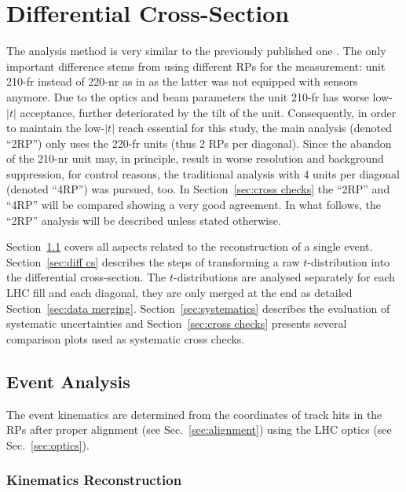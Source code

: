 \section{Differential Cross-Section}
\label{sec:differential cross-section}

The analysis method is very similar to the previously published one \cite{totem-8tev-1km}. The only important difference stems from using different RPs for the measurement: unit 210-fr instead of 220-nr as in \cite{totem-8tev-1km} as the latter was not equipped with sensors anymore. Due to the optics and beam parameters the unit 210-fr has worse low-$|t|$ acceptance, further deteriorated by the tilt of the unit. Consequently, in order to maintain the low-$|t|$ reach essential for this study, the main analysis (denoted ``2RP'') only uses the 220-fr units (thus 2 RPs per diagonal). Since the abandon of the 210-nr unit may, in principle, result in worse resolution and background suppression, for control reasons, the traditional analysis with 4 units per diagonal (denoted ``4RP'') was pursued, too. In Section~\ref{sec:cross checks} the ``2RP'' and ``4RP'' will be compared showing a very good agreement. In what follows, the ``2RP'' analysis will be described unless stated otherwise.

Section~\ref{sec:event analysis} covers all aspects related to the reconstruction of a single event. Section~\ref{sec:diff cs} describes the steps of transforming a raw $t$-distribution into the differential cross-section. The $t$-distributions are analysed separately for each LHC fill and each diagonal, they are only merged at the end as detailed Section~\ref{sec:data merging}. Section~\ref{sec:systematics} describes the evaluation of systematic uncertainties and Section~\ref{sec:cross checks} presents several comparison plots used as systematic cross checks.

\subsection{Event Analysis}
\label{sec:event analysis}

The event kinematics are determined from the coordinates of track hits in the RPs after proper alignment (see Sec.~\ref{sec:alignment}) using the LHC optics (see Sec.~\ref{sec:optics}).


\subsubsection{Kinematics Reconstruction}
\label{sec:kinematics}

